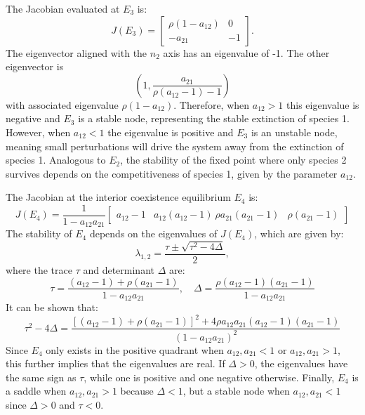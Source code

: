 The Jacobian evaluated at $E_3$ is:
\begin{equation*}
J(E_3) =
\begin{bmatrix}
\rho(1-a_{12}) & 0\\
-a_{21} & -1
\end{bmatrix}.
\end{equation*}
The eigenvector aligned with the $n_2$ axis has an eigenvalue of -1. The other eigenvector is
\begin{equation*}
\left(1, \frac{a_{21}}{\rho(a_{12}-1)-1} \right)
\end{equation*}
with associated eigenvalue $\rho(1-a_{12})$. Therefore, when $a_{12}>1$ this eigenvalue is negative and $E_3$ is a stable node, representing the stable extinction of species 1. However, when $a_{12}<1$ the eigenvalue is positive and $E_3$ is an unstable node, meaning small perturbations will drive the system away from the extinction of species 1. Analogous to $E_2$, the stability of the fixed point where only species 2 survives depends on the competitiveness of species 1, given by the parameter $a_{12}$.

The Jacobian at the interior coexistence equilibrium $E_4$ is:
\begin{equation*}
    J(E_4) = \frac{1}{1-a_{12}a_{21}}\begin{bmatrix}
    a_{12}-1 & a_{12} (a_{12}-1) \
\rho a_{21} (a_{21}-1) & \rho(a_{21}-1)
\end{bmatrix}
\end{equation*}
The stability of $E_4$ depends on the eigenvalues of $J(E_4)$, which are given by:
\begin{equation*}
    \lambda_{1,2} = \frac{\tau \pm \sqrt{\tau^2 - 4\Delta}}{2},
\end{equation*}
where the trace $\tau$ and determinant $\Delta$ are:
\begin{equation*}
    \tau = \frac{(a_{12}-1)+\rho(a_{21}-1)}{1-a_{12}a_{21}}, \quad
    \Delta = \frac{\rho(a_{12}-1)(a_{21}-1)}{1-a_{12}a_{21}}
\end{equation*}
It can be shown that:
\begin{equation*}
    \tau^2 - 4\Delta = \frac{[(a_{12}-1)+\rho(a_{21}-1)]^2 + 4\rho a_{12}a_{21}(a_{12}-1)(a_{21}-1)}{(1-a_{12}a_{21})^2}
\end{equation*}
Since $E_4$ only exists in the positive quadrant when $a_{12},a_{21}<1$ or $a_{12},a_{21}>1$, this further implies that the eigenvalues are real. If $\Delta>0$, the eigenvalues have the same sign as $\tau$, while one is positive and one negative otherwise. Finally, $E_4$ is a saddle when $a_{12},a_{21}>1$ because $\Delta<1$, but a stable node when $a_{12},a_{21}<1$ since $\Delta>0$ and $\tau<0$.



